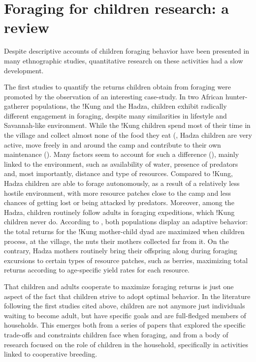 \section{Foraging for children research: a review}

Despite descriptive accounts of children foraging behavior have been presented in many ethnographic studies, quantitative research on these activities had a slow development.

The first studies to quantify the returns children obtain from foraging were promoted by the observation of an interesting case-study. In two African hunter-gatherer populations, the !Kung and the Hadza, children exhibit radically different engagement in foraging, despite many similarities in lifestyle and Savannah-like environment. While the !Kung children spend most of their time in the village and collect almost none of the food they eat (\cite{lee_social_1976}, Hadza children are very active, move freely in and around the camp and contribute to their own maintenance (\cite{blurton_jones_differences_1994, crittenden_juvenile_2013}). Many factors seem to account for such a difference (\cite{blurton_jones_modelling_1989, blurton_jones_differences_1994, blurton_jones_foraging_1994, blurton_jones_why_1997}), mainly linked to the environment, such as availability of water, presence of predators and, most importantly, distance and type of resources. Compared to !Kung, Hadza children are able to forage autonomously, as a result of a relatively less hostile environment, with more resource patches close to the camp and less chances of getting lost or being attacked by predators. 
Moreover, among the Hadza, children routinely follow adults in foraging expeditions, which !Kung children never do. According to \cite{hawkes_hadza_1995}, both populations display an adaptive behavior: the total returns for the !Kung mother-child dyad are maximized when children process, at the village, the nuts their mothers collected far from it. On the contrary, Hadza mothers routinely bring their offspring along during foraging excursions to certain types of resource patches, such as berries, maximizing total returns according to age-specific yield rates for each resource.

That children and adults cooperate to maximize foraging returns is just one aspect of the fact that children strive to adopt optimal behavior. In the literature following the first studies cited above, children are not anymore just individuals waiting to become adult, but have specific goals and are full-fledged members of households. This emerges both from a series of papers that explored the specific trade-offs and constraints children face when foraging, and from a body of research focused on the role of children in the household, specifically in activities linked to cooperative breeding.  

